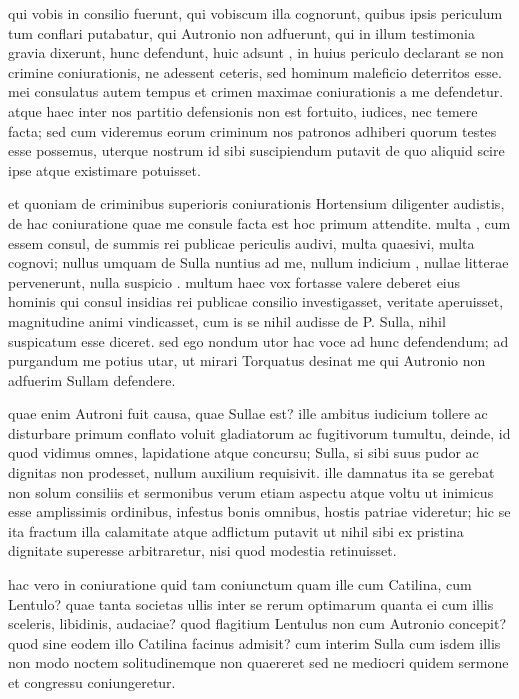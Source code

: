  qui vobis in consilio fuerunt, qui vobiscum illa cognorunt, quibus ipsis periculum tum conflari putabatur, qui Autronio non adfuerunt, qui in illum testimonia gravia dixerunt, hunc defendunt, huic adsunt , in huius periculo declarant se non crimine coniurationis, ne adessent ceteris, sed hominum maleficio deterritos esse. mei consulatus autem tempus et crimen maximae coniurationis a me defendetur. atque haec inter nos partitio defensionis non est fortuito, iudices, nec temere facta; sed cum videremus eorum criminum nos patronos adhiberi quorum testes esse possemus, uterque nostrum id sibi suscipiendum putavit de quo aliquid scire ipse atque existimare potuisset.

 et quoniam de criminibus superioris coniurationis Hortensium diligenter audistis, de hac coniuratione quae me consule facta est hoc primum attendite. multa , cum essem consul, de summis rei publicae periculis audivi, multa quaesivi, multa cognovi; nullus umquam de Sulla nuntius ad me, nullum indicium , nullae litterae pervenerunt, nulla suspicio . multum haec vox fortasse valere deberet eius hominis qui consul insidias rei publicae consilio investigasset, veritate aperuisset, magnitudine animi vindicasset, cum is se nihil audisse de P. Sulla, nihil suspicatum esse diceret. sed ego nondum utor hac voce ad hunc defendendum; ad purgandum me potius utar, ut mirari Torquatus desinat me qui Autronio non adfuerim Sullam defendere.

 quae enim Autroni fuit causa, quae Sullae est? ille ambitus iudicium tollere ac disturbare primum conflato voluit gladiatorum ac fugitivorum tumultu, deinde, id quod vidimus omnes, lapidatione atque concursu; Sulla, si sibi suus pudor ac dignitas non prodesset, nullum auxilium requisivit. ille damnatus ita se gerebat non solum consiliis et sermonibus verum etiam aspectu atque voltu ut inimicus esse amplissimis ordinibus, infestus bonis omnibus, hostis patriae videretur; hic se ita fractum illa calamitate atque adflictum putavit ut nihil sibi ex pristina dignitate superesse arbitraretur, nisi quod modestia retinuisset.

 hac vero in coniuratione quid tam coniunctum quam ille cum Catilina, cum Lentulo? quae tanta societas ullis inter se rerum optimarum quanta ei cum illis sceleris, libidinis, audaciae? quod flagitium Lentulus non cum Autronio concepit? quod sine eodem illo Catilina facinus admisit? cum interim Sulla cum isdem illis non modo noctem solitudinemque non quaereret sed ne mediocri quidem sermone et congressu coniungeretur.

